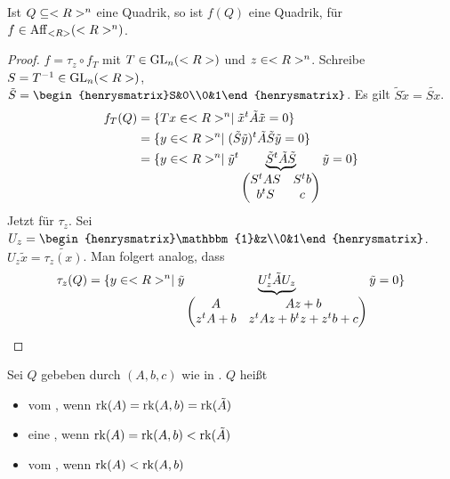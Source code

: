 \begin{lemma}
	Ist $Q\subseteq<R>^n$ eine Quadrik, so ist $f(Q)$ eine Quadrik, für $f\in\operatorname{Aff}_{<R>}(<R>^n)$.
\end{lemma}
\begin{proof}
	$f=\tau_z\circ f_T$ mit $T\in\operatorname{GL}_n(<R>)$ und $z\in<R>^n$. Schreibe $S=T^{-1}\in\operatorname{GL}_n(<R>)$, $\tilde{S}=\begin{henrysmatrix}S&0\\0&1\end{henrysmatrix}$. Es gilt $\tilde{S}\tilde{x}=\tilde{Sx}$.
	\begin{align}
		f_T(Q)&=\{Tx\in<R>^n\mid \tilde{x}^t\tilde{A}\tilde{x}=0\}\notag \\
		&=\{y\in<R>^n\mid (\tilde{S}\tilde{y})^t\tilde{A}\tilde{S}\tilde{y}=0\}\notag \\
		&=\{y\in<R>^n\mid \tilde{y}^t\underbrace{\tilde{S}^t\tilde{A}\tilde{S}}_{\begin{pmatrix}S^tAS&S^tb\\b^tS&c\end{pmatrix}}\tilde{y}=0\}\notag
	\end{align}
	Jetzt für $\tau_z$. Sei $U_z=\begin{henrysmatrix}\mathbbm{1}&z\\0&1\end{henrysmatrix}$. $U_z\tilde{x}=\tilde{\tau_z(x)}$. Man folgert analog, dass 
	\begin{align}
		\tau_z(Q)=\{y\in<R>^n\mid \tilde{y}\underbrace{U_z^t\tilde{A}U_z}_{\begin{pmatrix} A&Az+b\\z^tA+b&z^tAz+b^tz+z^tb+c\end{pmatrix}}\tilde{y}=0\}\notag
	\end{align}
\end{proof}

\begin{definition}
	Sei $Q$ gebeben durch $(A,b,c)$ wie in . $Q$ heißt
	\begin{itemize}
		\item vom , wenn $\operatorname{rk}(A)=\operatorname{rk}(A,b)=\operatorname{rk}(\tilde{A})$
		\item eine , wenn $\operatorname{rk}(A)=\operatorname{rk}(A,b)<\operatorname{rk}(\tilde{A})$
		\item vom , wenn $\operatorname{rk}(A)<\operatorname{rk}(A,b)$
	\end{itemize}
\end{definition}

